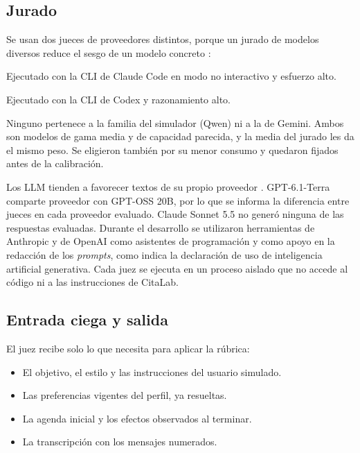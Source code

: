\subsection{Jurado}

Se usan dos jueces de proveedores distintos, porque un jurado de modelos
diversos reduce el sesgo de un modelo concreto \citep{verga2024poll}:

\begin{description}[style=nextline]
  \item[Claude Sonnet 5.5 (Anthropic).] Ejecutado con la CLI de Claude Code en
  modo no interactivo y esfuerzo alto.
  \item[GPT-6.1-Terra (OpenAI).] Ejecutado con la CLI de Codex y razonamiento
  alto.
\end{description}

Ninguno pertenece a la familia del simulador (Qwen) ni a la de Gemini. Ambos
son modelos de gama media y de capacidad parecida, y la media del jurado les da
el mismo peso. Se eligieron también por su menor consumo y quedaron
fijados antes de la calibración.

Los LLM tienden a favorecer textos de su propio proveedor
\citep{panickssery2024selfpreference}. GPT-6.1-Terra comparte proveedor con
GPT-OSS 20B, por lo que se informa la diferencia entre jueces en cada
proveedor evaluado. Claude Sonnet 5.5 no generó ninguna de las respuestas
evaluadas. Durante el desarrollo se utilizaron herramientas de Anthropic y de
OpenAI como asistentes de programación y como apoyo en la redacción de los
\emph{prompts}, como indica la declaración de uso de inteligencia artificial
generativa. Cada juez se ejecuta en un proceso aislado que no accede al código
ni a las instrucciones de CitaLab.

\subsection{Entrada ciega y salida}

El juez recibe solo lo que necesita para aplicar la rúbrica:

\begin{itemize}
  \item El objetivo, el estilo y las instrucciones del usuario simulado.
  \item Las preferencias vigentes del perfil, ya resueltas.
  \item La agenda inicial y los efectos observados al terminar.
  \item La transcripción con los mensajes numerados.
\end{itemize}


